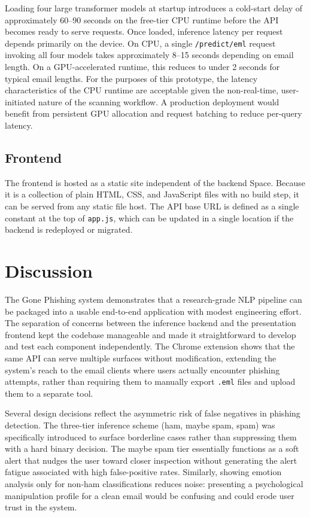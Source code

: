 Loading four large transformer models at startup introduces a cold-start delay of approximately 60--90 seconds on the free-tier \ac{CPU} runtime before the \ac{API} becomes ready to serve requests. Once loaded, inference latency per request depends primarily on the device. On \ac{CPU}, a single \texttt{/predict/eml} request invoking all four models takes approximately 8--15 seconds depending on email length. On a \ac{GPU}-accelerated runtime, this reduces to under 2 seconds for typical email lengths. For the purposes of this prototype, the latency characteristics of the \ac{CPU} runtime are acceptable given the non-real-time, user-initiated nature of the scanning workflow. A production deployment would benefit from persistent \ac{GPU} allocation and request batching to reduce per-query latency.

\subsection{Frontend}

The frontend is hosted as a static site independent of the backend Space. Because it is a collection of plain \ac{HTML}, CSS, and JavaScript files with no build step, it can be served from any static file host. The API base URL is defined as a single constant at the top of \texttt{app.js}, which can be updated in a single location if the backend is redeployed or migrated.

\section{Discussion}

The Gone Phishing system demonstrates that a research-grade NLP pipeline can be packaged into a usable end-to-end application with modest engineering effort. The separation of concerns between the inference backend and the presentation frontend kept the codebase manageable and made it straightforward to develop and test each component independently. The Chrome extension shows that the same \ac{API} can serve multiple surfaces without modification, extending the system's reach to the email clients where users actually encounter phishing attempts, rather than requiring them to manually export \texttt{.eml} files and upload them to a separate tool.

Several design decisions reflect the asymmetric risk of false negatives in phishing detection. The three-tier inference scheme (ham, maybe spam, spam) was specifically introduced to surface borderline cases rather than suppressing them with a hard binary decision. The maybe spam tier essentially functions as a soft alert that nudges the user toward closer inspection without generating the alert fatigue associated with high false-positive rates. Similarly, showing emotion analysis only for non-ham classifications reduces noise: presenting a psychological manipulation profile for a clean email would be confusing and could erode user trust in the system.

